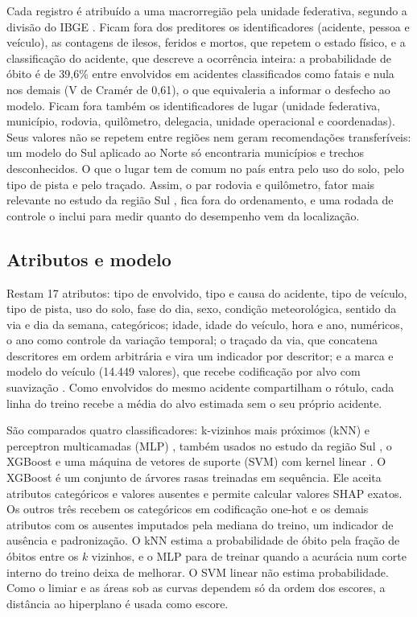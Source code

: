 \documentclass[12pt]{article}
\begin{document}
Cada registro é atribuído a uma macrorregião pela unidade federativa,
segundo a divisão do IBGE \cite{ibge2017}. Ficam fora dos preditores os
identificadores (acidente, pessoa e veículo), as contagens de ilesos,
feridos e mortos, que repetem o estado físico, e a classificação do
acidente, que descreve a ocorrência inteira: a probabilidade de óbito é
de 39,6\% entre envolvidos em acidentes classificados como fatais e nula
nos demais (V de Cramér de 0,61), o que equivaleria a informar o
desfecho ao modelo. Ficam fora também os identificadores de lugar
(unidade federativa, município, rodovia, quilômetro, delegacia, unidade
operacional e coordenadas). Seus valores não se repetem entre regiões
nem geram recomendações transferíveis: um modelo do Sul aplicado ao
Norte só encontraria municípios e trechos desconhecidos. O que o lugar
tem de comum no país entra pelo uso do solo, pelo tipo de pista e pelo
traçado. Assim, o par rodovia e quilômetro, fator mais relevante no
estudo da região Sul \cite{gabardo2025}, fica fora do ordenamento, e uma
rodada de controle o inclui para medir quanto do desempenho vem da
localização.

\subsection{Atributos e modelo}

Restam 17 atributos: tipo de envolvido, tipo e causa do acidente, tipo de
veículo, tipo de pista, uso do solo, fase do dia, sexo, condição
meteorológica, sentido da via e dia da semana, categóricos; idade, idade
do veículo, hora e ano, numéricos, o ano como controle da variação
temporal; o traçado da via, que concatena descritores em ordem
arbitrária e vira um indicador por descritor; e a marca e modelo do
veículo (14.449 valores), que recebe codificação por alvo com suavização
\cite{micci2001}. Como envolvidos do mesmo acidente compartilham o
rótulo, cada linha do treino recebe a média do alvo estimada sem o seu
próprio acidente.

São comparados quatro classificadores: k-vizinhos mais próximos (kNN)
\cite{cover1967} e perceptron multicamadas (MLP) \cite{rumelhart1986},
também usados no estudo da região Sul \cite{gabardo2025}, o XGBoost
\cite{chen2016} e uma máquina de vetores de suporte (SVM) com kernel
linear \cite{cortes1995}. O XGBoost é um conjunto de árvores rasas
treinadas em sequência. Ele aceita atributos categóricos e valores
ausentes e permite calcular valores SHAP exatos. Os outros três recebem
os categóricos em codificação one-hot e os demais atributos com os
ausentes imputados pela mediana do treino, um indicador de ausência e
padronização. O kNN estima a probabilidade de óbito pela fração de
óbitos entre os $k$ vizinhos, e o MLP para de treinar quando a acurácia
num corte interno do treino deixa de melhorar. O SVM linear não estima
probabilidade. Como o limiar e as áreas sob as curvas dependem só da
ordem dos escores, a distância ao hiperplano é usada como escore.
\end{document}

